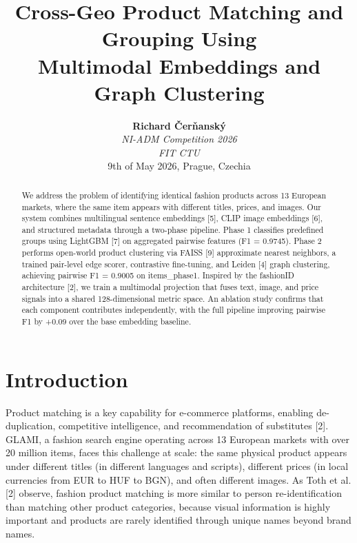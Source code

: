 \documentclass[10pt,twocolumn,a4paper]{article}
\date{}
\begin{document}
\title{\Large\bfseries Cross-Geo Product Matching and Grouping Using\\Multimodal Embeddings and Graph Clustering}

\author{
    \textbf{Richard Čerňanský} \\
    \textit{NI-ADM Competition 2026} \\
    \textit{FIT CTU}\\
    9th of May 2026, Prague, Czechia
}

\maketitle

\begin{abstract}
\noindent We address the problem of identifying identical fashion products across 13 European markets, where the same 
item appears with different titles, prices, and images. Our system combines multilingual sentence embeddings [5], 
CLIP image embeddings [6], and structured metadata through a two-phase pipeline. Phase 1 classifies predefined groups 
using LightGBM [7] on aggregated pairwise features (F1 = 0.9745). Phase 2 performs open-world product 
clustering via FAISS [9] approximate nearest neighbors, a trained pair-level edge scorer, contrastive fine-tuning, and Leiden [4] 
graph clustering, achieving pairwise F1 = 0.9005 on items\_phase1. Inspired by the fashionID architecture [2], we train a multimodal
projection that fuses text, image, and price signals into a shared 128-dimensional metric space.
An ablation study confirms that each component contributes independently, with the full pipeline improving pairwise F1 by +0.09 over the base embedding baseline.
\end{abstract}

\vspace{1em}

\section{Introduction}
Product matching is a key capability for e-commerce platforms, enabling de-duplication, competitive intelligence, and 
recommendation of substitutes [2]. GLAMI, a fashion search engine operating across 13 European markets with over 20 million items, faces this challenge at scale: the same physical product appears under different titles (in different languages and scripts), different prices (in local currencies from EUR to HUF to BGN), and often different images. As Toth et al. [2] observe, fashion product matching is more similar to person re-identification than matching other product categories, because visual information is highly important and products are rarely identified through unique names beyond brand names.
\end{document}
